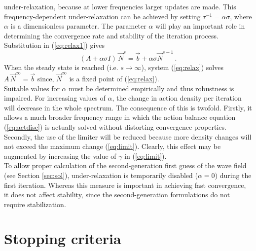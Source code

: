 \documentclass[12pt]{book}
\begin{document}
under-relaxation, because at lower frequencies larger updates are made. This
frequency-dependent under-relaxation can be achieved by setting ${\tau}^{-1} = \alpha \sigma$,
where $\alpha$ is a dimensionless parameter.
The parameter $\alpha$ will play an important role in
determining the convergence rate and stability of the iteration process.
Substitution in (\ref{eq:relax1}) gives
\begin{equation}
  (A + \alpha \sigma I)\, {\vec{N}}^s = \vec{b} + \alpha \sigma {\vec{N}}^{s-1} \, .
  \label{eq:relax}
\end{equation}
When the steady state is
reached (i.e. $s \rightarrow \infty$), system (\ref{eq:relax}) solves $A\,{\vec{N}}^{\infty} = \vec{b}$ since,
${\vec{N}}^{\infty}$ is a fixed point of (\ref{eq:relax}).
\\[2ex]
\noindent
Suitable values for $\alpha$ must be determined empirically and thus robustness is impaired.
For increasing values of $\alpha$, the change in action density per iteration will decrease in
the whole spectrum. The consequence of this is twofold. Firstly, it allows a much broader frequency
range in which the action balance equation (\ref{eq:actdisc}) is actually solved without distorting convergence
properties.
Secondly, the use of the limiter will be reduced because more density changes will not exceed the maximum
change (\ref{eq:limit}). Clearly, this effect may be augmented by
increasing the value of $\gamma$ in (\ref{eq:limit}).
\\[2ex]
\noindent
To allow proper calculation of the second-generation first guess of the wave
field (see Section \ref{sec:sol}), under-relaxation is temporarily disabled
($\alpha = 0$) during the first iteration. Whereas this measure is important
in achieving fast convergence, it does not affect stability, since the
second-generation formulations do not require stabilization.

\section{Stopping criteria} \label{sec:stop}
\end{document}
